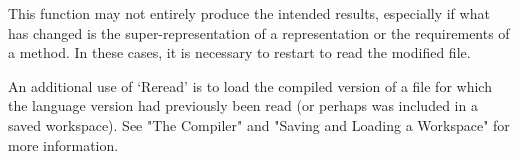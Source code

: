 This function may not entirely produce the intended results,
especially if what has changed is the super-representation of a
representation or the requirements of a method. In these cases, it is
necessary to restart {\GAP} to read the modified file.

An additional use of `Reread' is to load the compiled version of a
file for which the {\GAP} language version had previously been read
(or perhaps was included in a saved workspace). See "The Compiler" and 
"Saving and Loading a Workspace" for more information.


